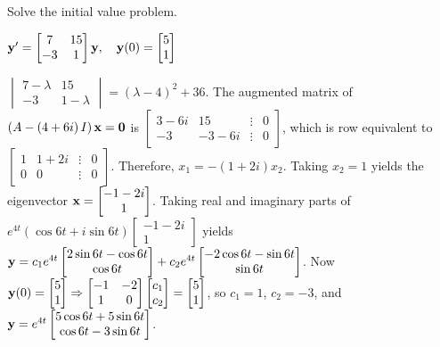 \documentclass{ximera}
\begin{document}
 \begin{problem}\label{exer:10.6.18}
 Solve the initial value problem.
 
$ {\bf y}'= \begin{bmatrix}7&15\\-3&1\end{bmatrix}{\bf y},\quad {\bf
y}(0)= \begin{bmatrix}5\\1\end{bmatrix}$

\begin{solution}
    $\begin{vmatrix}7-\lambda&15\\-3&1-\lambda
\end{vmatrix}=(\lambda-4)^2+36$. The augmented matrix of
$\left(A-\left(4+6i\right)I\right){\bf x}={\bf 0}$ is
$ \begin{bmatrix}3-6i&15&\vdots&0\\-3&-3-6i&\vdots&0
 \end{bmatrix}$, which is row equivalent to
$ \begin{bmatrix} 1&1+2i&\vdots&0\\ 0&0&\vdots&0
 \end{bmatrix}$. Therefore,  $x_1=-(1+2i)x_2$. Taking $x_2=1$ yields
the eigenvector ${\bf
x}= \begin{bmatrix}-1-2i\\1 \end{bmatrix}$.
Taking real and imaginary parts of
$e^{4t}(\cos6t+i\sin6t) \begin{bmatrix}-1-2i\\1 \end{bmatrix}$
yields ${\bf y}= c_1e^{4t}\begin{bmatrix}2\sin6t-\cos6t\\\cos6t \end{bmatrix}
+c_2e^{4t}\begin{bmatrix}-2\cos6t-\sin6t\\\sin6t \end{bmatrix}$. Now ${\bf
y}(0)=\begin{bmatrix}5\\1 \end{bmatrix}\Rightarrow
\begin{bmatrix}-1&-2\\1&0 \end{bmatrix}\begin{bmatrix}c_1\\c_2 \end{bmatrix}=\begin{bmatrix}5\\1 \end{bmatrix}$, so $c_1=1$, $c_2=-3$,
and $ {\bf
y}=e^{4t} \begin{bmatrix}5\cos6t+5\sin6t\\\cos6t-3\sin6t
 \end{bmatrix}$.
\end{solution}
\end{problem}
\end{document}
